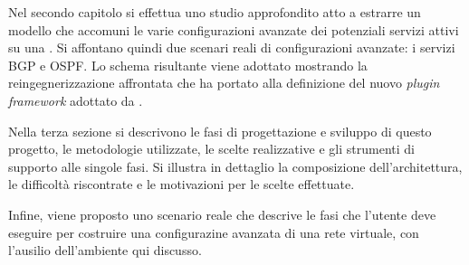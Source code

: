 Nel secondo capitolo si effettua uno studio approfondito atto a estrarre un modello che accomuni le varie configurazioni avanzate dei potenziali servizi attivi su una \virtualmachine{}. Si affontano quindi due scenari reali di configurazioni avanzate: i servizi BGP e OSPF. Lo schema risultante viene adottato mostrando la reingegnerizzazione affrontata che ha portato alla definizione del nuovo \emph{plugin framework} adottato da \visualnetkit{}.

Nella terza sezione si descrivono le fasi di progettazione e sviluppo di questo progetto, le metodologie utilizzate, le scelte realizzative e gli strumenti di supporto alle singole fasi. Si illustra in dettaglio la composizione dell'architettura, le difficoltà riscontrate e le motivazioni per le scelte effettuate.

Infine, viene proposto uno scenario reale che descrive le fasi che l'utente deve eseguire per costruire una configurazine avanzata di una rete virtuale, con l'ausilio dell'ambiente qui discusso.
